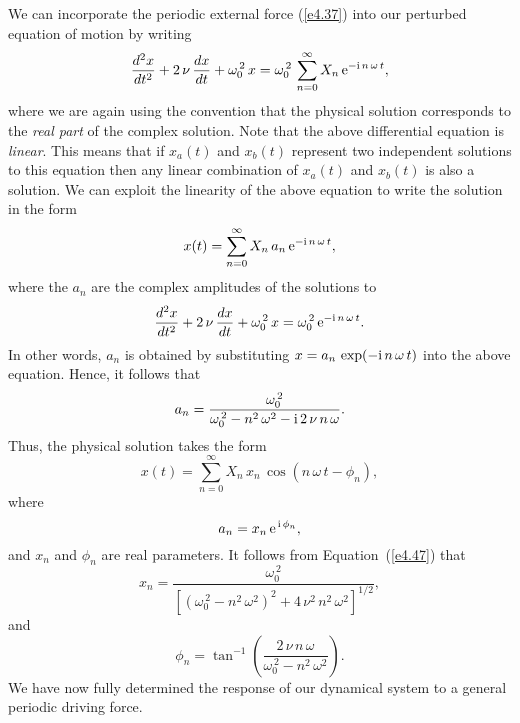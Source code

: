 We can incorporate the periodic external force (\ref{e4.37}) into our
perturbed equation of motion by writing
\begin{equation}
\frac{d^2 x}{dt^2} + 2\,\nu\,\frac{dx}{dt} + \omega_0^{\,2}\,x
= \omega_0^{\,2}\,\sum_{n=0}^\infty X_n\,{\rm e}^{-{\rm i}\,n\,\omega\,t},
\end{equation}
where we are again using the convention that the physical solution
corresponds to the {\em real part}\/ of the complex solution. Note that
the above differential equation is {\em linear}. This means that if $x_a(t)$
and $x_b(t)$ represent two independent solutions to this equation then
any linear combination of $x_a(t)$ and $x_b(t)$ is also a solution. We can
exploit the linearity of the above equation to write the
solution in the form
\begin{equation}
x(t) = \sum_{n=0}^\infty X_n\,a_n\,{\rm e}^{-{\rm i}\,n\,\omega\,t},
\end{equation}
where the $a_n$ are the complex amplitudes of the solutions to
\begin{equation}
\frac{d^2 x}{dt^2} + 2\,\nu\,\frac{dx}{dt} + \omega_0^{\,2}\,x
= \omega_0^{\,2}\,{\rm e}^{-{\rm i}\,n\,\omega\,t}.
\end{equation}
In other words, $a_n$ is obtained by substituting $x = a_n\,\exp(-{\rm i}\,n\,\omega\,t)$ into the above equation.
Hence, it follows that
\begin{equation}\label{e4.47}
a_n = \frac{\omega_0^{\,2}}{\omega_0^{\,2} - n^2\,\omega^2 - 
{\rm i}\,2\,\nu\,n\,\omega}.
\end{equation}
Thus, the physical solution takes the form
\begin{equation}\label{e4.48}
x(t) = \sum_{n=0}^{\infty} X_n\,x_n\,\cos(n\,\omega\,t-\phi_n),
\end{equation}
where
\begin{equation}
a_n = x_n \,{\rm e}^{\,{\rm i}\,\phi_n},
\end{equation}
and $x_n$ and $\phi_n$ are real parameters. It follows from
Equation~(\ref{e4.47}) that
\begin{equation}
x_n = \frac{\omega_0^{\,2}}{\left[(\omega_0^{\,2}-n^2\,\omega^2)^2
+ 4\,\nu^2\,n^2\,\omega^2\right]^{1/2}},
\end{equation}
and
\begin{equation}
\phi_n = \tan^{-1}\left(\frac{2\,\nu\,n\,\omega}{\omega_0^{\,2}-n^2\,\omega^2}\right).
\end{equation}
We have now fully determined the response of our dynamical system to
a general periodic driving force.

